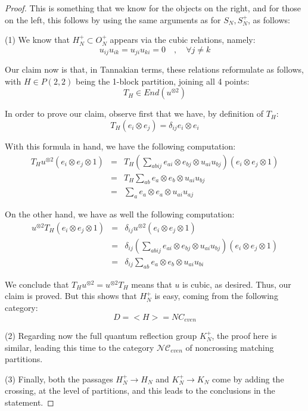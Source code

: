 \documentclass[12pt]{amsbook}
\begin{document}
\begin{proof}
This is something that we know for the objects on the right, and for those on the left, this follows by using the same arguments as for $S_N,S_N^+$, as follows:

\medskip

(1) We know that $H_N^+\subset O_N^+$ appears via the cubic relations, namely:
$$u_{ij}u_{ik}=u_{ji}u_{ki}=0\quad,\quad\forall j\neq k$$

Our claim now is that, in Tannakian terms, these relations reformulate as follows, with $H\in P(2,2)$ being the 1-block partition, joining all 4 points:
$$T_H\in End(u^{\otimes 2})$$

In order to prove our claim, observe first that we have, by definition of $T_H$:
$$T_H(e_i\otimes e_j)=\delta_{ij}e_i\otimes e_i$$

With this formula in hand, we have the following computation:
\begin{eqnarray*}
T_Hu^{\otimes 2}(e_i\otimes e_j\otimes1)
&=&T_H\left(\sum_{abij}e_{ai}\otimes e_{bj}\otimes u_{ai}u_{bj}\right)(e_i\otimes e_j\otimes1)\\
&=&T_H\sum_{ab}e_a\otimes e_b\otimes u_{ai}u_{bj}\\
&=&\sum_ae_a\otimes e_a\otimes u_{ai}u_{aj}
\end{eqnarray*}

On the other hand, we have as well the following computation:
\begin{eqnarray*}
u^{\otimes 2}T_H(e_i\otimes e_j\otimes1)
&=&\delta_{ij}u^{\otimes 2}(e_i\otimes e_j\otimes1)\\
&=&\delta_{ij}\left(\sum_{abij}e_{ai}\otimes e_{bj}\otimes u_{ai}u_{bj}\right)(e_i\otimes e_j\otimes1)\\
&=&\delta_{ij}\sum_{ab}e_a\otimes e_b\otimes u_{ai}u_{bi}
\end{eqnarray*}

We conclude that $T_Hu^{\otimes 2}=u^{\otimes 2}T_H$ means that $u$ is cubic, as desired. Thus, our claim is proved. But this shows that $H_N^+$ is easy, coming from the following category:
$$D=<H>=NC_{even}$$

(2) Regarding now the full quantum reflection group $K_N^+$, the proof here is similar, leading this time to the category $\mathcal{NC}_{even}$ of noncrossing matching partitions. 

\medskip

(3) Finally, both the passages $H_N^+\to H_N$ and $K_N^+\to K_N$ come by adding the crossing, at the level of partitions, and this leads to the conclusions in the statement.
\end{proof}
\end{document}

